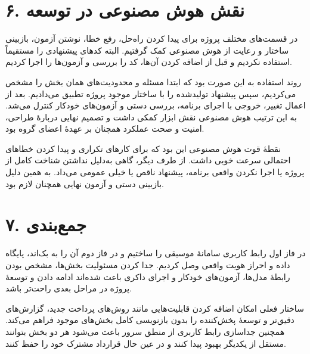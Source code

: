 \documentclass[12pt,twoside]{article}
\newcommand{\enword}[1]{\lr{#1}}
\begin{document}
\section*{۶. نقش هوش مصنوعی در توسعه}
در قسمت‌های مختلف پروژه برای پیدا کردن راه‌حل، رفع خطا، نوشتن آزمون، بازبینی
ساختار و رعایت \enword{best practice} از هوش مصنوعی کمک گرفتیم. البته کدهای
پیشنهادی را مستقیماً استفاده نکردیم و قبل از اضافه کردن آن‌ها، کد را بررسی و
آزمون‌ها را اجرا کردیم.

روند استفاده به این صورت بود که ابتدا مسئله و محدودیت‌های همان بخش را مشخص
می‌کردیم، سپس پیشنهاد تولیدشده را با ساختار موجود پروژه تطبیق می‌دادیم. بعد از
اعمال تغییر، خروجی با اجرای برنامه، بررسی دستی و آزمون‌های خودکار کنترل می‌شد.
به این ترتیب هوش مصنوعی نقش ابزار کمکی داشت و تصمیم نهایی دربارهٔ طراحی، امنیت
و صحت عملکرد همچنان بر عهدهٔ اعضای گروه بود.

نقطهٔ قوت هوش مصنوعی این بود که برای کارهای تکراری و پیدا کردن خطاهای احتمالی
سرعت خوبی داشت. از طرف دیگر، گاهی به‌دلیل نداشتن شناخت کامل از پروژه یا اجرا
نکردن واقعی برنامه، پیشنهاد ناقص یا خیلی عمومی می‌داد. به همین دلیل بازبینی
دستی و آزمون نهایی همچنان لازم بود.

\section*{۷. جمع‌بندی}
در فاز اول رابط کاربری سامانهٔ موسیقی را ساختیم و در فاز دوم آن را به بک‌اند،
پایگاه داده و احراز هویت واقعی وصل کردیم. جدا کردن مسئولیت بخش‌ها، مشخص بودن
رابطهٔ مدل‌ها، آزمون‌های خودکار و اجرای داکری باعث شده‌اند ادامه دادن و توسعهٔ
پروژه در مراحل بعدی راحت‌تر باشد.

ساختار فعلی امکان اضافه کردن قابلیت‌هایی مانند روش‌های پرداخت جدید، گزارش‌های
دقیق‌تر و توسعهٔ پخش‌کننده را بدون بازنویسی کامل بخش‌های موجود فراهم می‌کند.
همچنین جداسازی رابط کاربری از منطق سرور باعث می‌شود هر دو بخش بتوانند مستقل از
یکدیگر بهبود پیدا کنند و در عین حال قرارداد مشترک خود را حفظ کنند.
\end{document}
